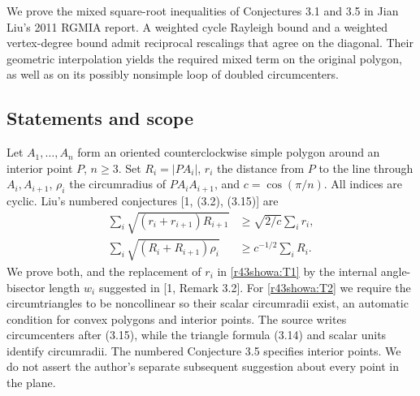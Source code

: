 \documentclass[11pt,a4paper]{article}
\numberwithin{equation}{section}
\theoremstyle{definition}
\theoremstyle{remark}
\newenvironment{sectionabstract}{\par\smallskip\begingroup\small\noindent}{\par\endgroup\medskip}
\begin{document}
\begin{sectionabstract}
We prove the mixed square-root inequalities of Conjectures 3.1 and 3.5 in Jian Liu's 2011 RGMIA report. A weighted cycle Rayleigh bound and a weighted vertex-degree bound admit reciprocal rescalings that agree on the diagonal. Their geometric interpolation yields the required mixed term on the original polygon, as well as on its possibly nonsimple loop of doubled circumcenters.
\end{sectionabstract}
\subsection{Statements and scope}
Let $A_1,\ldots,A_n$ form an oriented counterclockwise simple polygon around an interior point $P$, $n\ge3$. Set $R_i=|PA_i|$, $r_i$ the distance from $P$ to the line through $A_i,A_{i+1}$, $\rho_i$ the circumradius of $PA_iA_{i+1}$, and $c=\cos(\pi/n)$. All indices are cyclic. Liu's numbered conjectures [1, (3.2), (3.15)] are
\begin{align}
 \sum_i\sqrt{(r_i+r_{i+1})R_{i+1}}&\ge\sqrt{2/c}\sum_i r_i,\label{r43showa:T1}\\
 \sum_i\sqrt{(R_i+R_{i+1})\rho_i}&\ge c^{-1/2}\sum_i R_i.\label{r43showa:T2}
\end{align}
We prove both, and the replacement of $r_i$ in \eqref{r43showa:T1} by the internal angle-bisector length $w_i$ suggested in [1, Remark 3.2]. For \eqref{r43showa:T2} we require the circumtriangles to be noncollinear so their scalar circumradii exist, an automatic condition for convex polygons and interior points. The source writes circumcenters after (3.15), while the triangle formula (3.14) and scalar units identify circumradii. The numbered Conjecture 3.5 specifies interior points. We do not assert the author's separate subsequent suggestion about every point in the plane.
\end{document}
